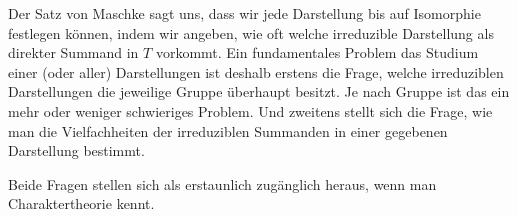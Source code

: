 \begin{remark}
Der Satz von Maschke sagt uns, dass wir jede Darstellung bis auf Isomorphie festlegen können, indem wir angeben, wie oft welche irreduzible Darstellung als direkter Summand in $T$ vorkommt. Ein fundamentales Problem das Studium einer (oder aller) Darstellungen ist deshalb erstens die Frage, welche irreduziblen Darstellungen die jeweilige Gruppe überhaupt besitzt. Je nach Gruppe ist das ein mehr oder weniger schwieriges Problem. Und zweitens stellt sich die Frage, wie man die Vielfachheiten der irreduziblen Summanden in einer gegebenen Darstellung bestimmt.

Beide Fragen stellen sich als erstaunlich zugänglich heraus, wenn man Charaktertheorie kennt.
\end{remark}